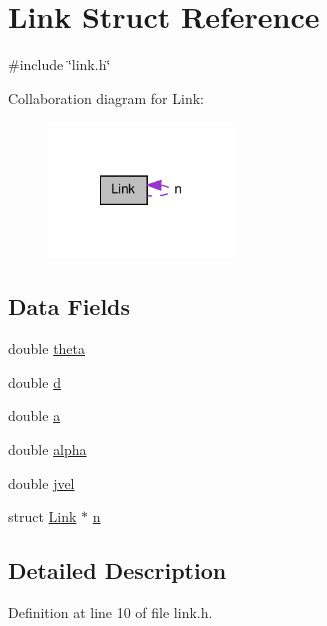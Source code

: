 \hypertarget{structLink}{\section{Link Struct Reference}
\label{structLink}
}


{\ttfamily \#include \char`\"{}link.\-h\char`\"{}}



Collaboration diagram for Link\-:\nopagebreak
\begin{figure}[H]
\begin{center}
\leavevmode
\includegraphics[width=141pt]{structLink__coll__graph}
\end{center}
\end{figure}
\subsection*{Data Fields}
\begin{DoxyCompactItemize}
\item 
double \hyperlink{structLink_a88e705bc7fb6c7c8c7fa6987b52667d6}{theta}
\item 
double \hyperlink{structLink_a4e5e4ea2ef9be2aae1e9fdef406be185}{d}
\item 
double \hyperlink{structLink_a3ef89c4478d7e2de8a59de9c88052123}{a}
\item 
double \hyperlink{structLink_ab838e5bc121c212cb1a81fdf78de8757}{alpha}
\item 
double \hyperlink{structLink_a9ba28f0b8b867ad4624abb9730ef30d2}{jvel}
\item 
struct \hyperlink{structLink}{Link} $\ast$ \hyperlink{structLink_a185503cf680f8e9395c19c0521997c5c}{n}
\end{DoxyCompactItemize}


\subsection{Detailed Description}


Definition at line 10 of file link.\-h.



